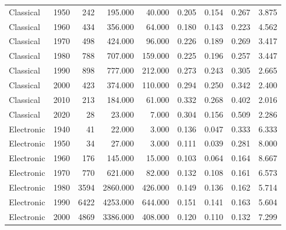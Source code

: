 \begin{table}
{\begin{tabular}{lrrrrrrrr}
             Classical &           1950 &        242 &  195.000 &   40.000 &        0.205 &  0.154 &  0.267 &                  3.875 \\
             Classical &           1960 &        434 &  356.000 &   64.000 &        0.180 &  0.143 &  0.223 &                  4.562 \\
             Classical &           1970 &        498 &  424.000 &   96.000 &        0.226 &  0.189 &  0.269 &                  3.417 \\
             Classical &           1980 &        788 &  707.000 &  159.000 &        0.225 &  0.196 &  0.257 &                  3.447 \\
             Classical &           1990 &        898 &  777.000 &  212.000 &        0.273 &  0.243 &  0.305 &                  2.665 \\
             Classical &           2000 &        423 &  374.000 &  110.000 &        0.294 &  0.250 &  0.342 &                  2.400 \\
             Classical &           2010 &        213 &  184.000 &   61.000 &        0.332 &  0.268 &  0.402 &                  2.016 \\
             Classical &           2020 &         28 &   23.000 &    7.000 &        0.304 &  0.156 &  0.509 &                  2.286 \\
            Electronic &           1940 &         41 &   22.000 &    3.000 &        0.136 &  0.047 &  0.333 &                  6.333 \\
            Electronic &           1950 &         34 &   27.000 &    3.000 &        0.111 &  0.039 &  0.281 &                  8.000 \\
            Electronic &           1960 &        176 &  145.000 &   15.000 &        0.103 &  0.064 &  0.164 &                  8.667 \\
            Electronic &           1970 &        770 &  621.000 &   82.000 &        0.132 &  0.108 &  0.161 &                  6.573 \\
            Electronic &           1980 &       3594 & 2860.000 &  426.000 &        0.149 &  0.136 &  0.162 &                  5.714 \\
            Electronic &           1990 &       6422 & 4253.000 &  644.000 &        0.151 &  0.141 &  0.163 &                  5.604 \\
            Electronic &           2000 &       4869 & 3386.000 &  408.000 &        0.120 &  0.110 &  0.132 &                  7.299 \\

\end{tabular}}
\end{table}
